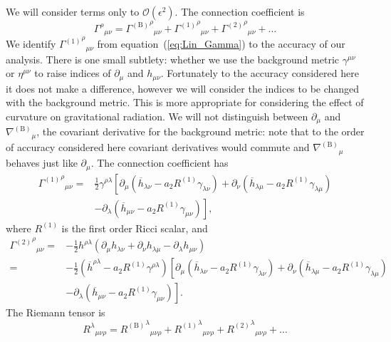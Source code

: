 \documentclass[a4paper, 11pt, titlepage, twoside]{report}
\newcommand{\eqnref}[1]{equation~(\ref{eq:#1})}
\newcommand{\order}[1]{\ensuremath{\mathcal{O}({#1})}}
\begin{document}
We will consider terms only to $\order{\epsilon^2}$. The connection coefficient is
\begin{equation}
{\Gamma^\rho}_{\mu\nu} = {{\Gamma^{(\mathrm{B})}}^\rho}_{\mu\nu} + {{\Gamma^{(1)}}^\rho}_{\mu\nu} + {{\Gamma^{(2)}}^\rho}_{\mu\nu} + \ldots
\end{equation}
We identify ${{\Gamma^{(1)}}^\rho}_{\mu\nu}$ from \eqnref{Lin_Gamma} to the accuracy of our analysis. There is one small subtlety: whether we use the background metric $\gamma^{\mu\nu}$ or $\eta^{\mu\nu}$ to raise indices of $\partial_\mu$ and $h_{\mu\nu}$. Fortunately to the accuracy considered here it does not make a difference, however we will consider the indices to be changed with the background metric. This is more appropriate for considering the effect of curvature on gravitational radiation. We will not distinguish between $\partial_\mu$ and ${\nabla^{(\mathrm{B})}}_\mu$, the covariant derivative for the background metric: note that to the order of accuracy considered here covariant derivatives would commute and ${\nabla^{(\mathrm{B})}}_\mu$ behaves just like $\partial_\mu$. The connection coefficient has
\begin{align}
{{\Gamma^{(1)}}^\rho}_{\mu\nu} = {} & \frac{1}{2}\gamma^{\rho\lambda}\left[\partial_\mu \left(\overline{h}_{\lambda\nu} - a_2 R^{(1)}\gamma_{\lambda\nu}\right) + \partial_\nu \left(\overline{h}_{\lambda\mu} - a_2 R^{(1)}\gamma_{\lambda\mu}\right) \right. \nonumber \\ 
  & - \left. \partial_\lambda \left(\overline{h}_{\mu\nu} - a_2 R^{(1)}\gamma_{\mu\nu}\right)\right],
\end{align}
where $R^{(1)}$ is the first order Ricci scalar, and
\begin{align}
{{\Gamma^{(2)}}^\rho}_{\mu\nu} = {} & -\frac{1}{2}h^{\rho\lambda}(\partial_\mu h_{\lambda\nu} + \partial_\nu h_{\lambda\mu} - \partial_\lambda h_{\mu\nu}) \nonumber \\ 
 = {} & -\frac{1}{2}\left(\overline{h}^{\rho\lambda} - a_2 R^{(1)}\gamma^{\rho\lambda}\right)\left[\partial_\mu \left(\overline{h}_{\lambda\nu} - a_2 R^{(1)}\gamma_{\lambda\nu}\right) + \partial_\nu \left(\overline{h}_{\lambda\mu} - a_2 R^{(1)}\gamma_{\lambda\mu}\right) \right. \nonumber \\
 & - \left. \partial_\lambda \left(\overline{h}_{\mu\nu} - a_2 R^{(1)}\gamma_{\mu\nu}\right)\right].
\end{align}
The Riemann tensor is
\begin{equation}
{R^\lambda}_{\mu\nu\rho} = {{R^{(\mathrm{B})}}^\lambda}_{\mu\nu\rho} + {{R^{(1)}}^\lambda}_{\mu\nu\rho} + {{R^{(2)}}^\lambda}_{\mu\nu\rho} + \ldots
\end{equation}
\end{document}
